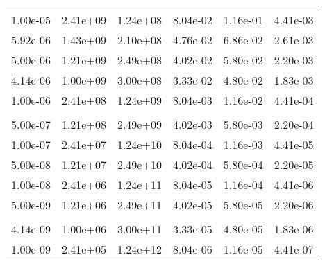 \documentclass[a4paper]{report}
\begin{document}
\begin{center}
\begin{tabular}{c|c|c|c|c|c}
&&&&& \\ 
1.00e-05 & 2.41e+09 & 1.24e+08 & 8.04e-02 & 1.16e-01 & 4.41e-03 \\ 
5.92e-06 & 1.43e+09 & 2.10e+08 & 4.76e-02 & 6.86e-02 & 2.61e-03 \\ 
5.00e-06 & 1.21e+09 & 2.49e+08 & 4.02e-02 & 5.80e-02 & 2.20e-03 \\ 
4.14e-06 & 1.00e+09 & 3.00e+08 & 3.33e-02 & 4.80e-02 & 1.83e-03 \\ 
1.00e-06 & 2.41e+08 & 1.24e+09 & 8.04e-03 & 1.16e-02 & 4.41e-04 \\ 
&&&&& \\ 
5.00e-07 & 1.21e+08 & 2.49e+09 & 4.02e-03 & 5.80e-03 & 2.20e-04 \\ 
1.00e-07 & 2.41e+07 & 1.24e+10 & 8.04e-04 & 1.16e-03 & 4.41e-05 \\ 
5.00e-08 & 1.21e+07 & 2.49e+10 & 4.02e-04 & 5.80e-04 & 2.20e-05 \\ 
1.00e-08 & 2.41e+06 & 1.24e+11 & 8.04e-05 & 1.16e-04 & 4.41e-06 \\ 
5.00e-09 & 1.21e+06 & 2.49e+11 & 4.02e-05 & 5.80e-05 & 2.20e-06 \\ 
&&&&& \\ 
4.14e-09 & 1.00e+06 & 3.00e+11 & 3.33e-05 & 4.80e-05 & 1.83e-06 \\ 
1.00e-09 & 2.41e+05 & 1.24e+12 & 8.04e-06 & 1.16e-05 & 4.41e-07 \\ 

\bottomrule

\end{tabular}
\end{center}

  
\end{document}
